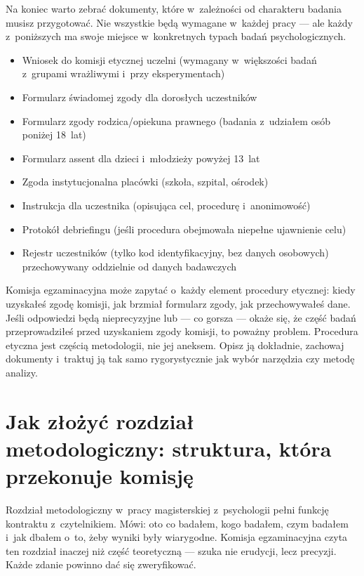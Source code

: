 \documentclass[12pt,a4paper,twoside,openany]{book}
\let\bforigsection\section
\renewcommand{\section}{\needspace{4\baselineskip}\bforigsection}
\begin{document}
Na koniec warto zebrać dokumenty, które w~zależności od charakteru badania musisz przygotować. Nie wszystkie będą wymagane w~każdej pracy --- ale każdy z~poniższych ma swoje miejsce w~konkretnych typach badań psychologicznych.

\begin{itemize}
 \item Wniosek do komisji etycznej uczelni (wymagany w~większości badań z~grupami wrażliwymi i~przy eksperymentach)
 \item Formularz świadomej zgody dla dorosłych uczestników
 \item Formularz zgody rodzica/opiekuna prawnego (badania z~udziałem osób poniżej 18~lat)
 \item Formularz assent dla dzieci i~młodzieży powyżej 13~lat
 \item Zgoda instytucjonalna placówki (szkoła, szpital, ośrodek)
 \item Instrukcja dla uczestnika (opisująca cel, procedurę i~anonimowość)
 \item Protokół debriefingu (jeśli procedura obejmowała niepełne ujawnienie celu)
 \item Rejestr uczestników (tylko kod identyfikacyjny, bez danych osobowych) przechowywany oddzielnie od danych badawczych
\end{itemize}

\begin{keyinsight}
Komisja egzaminacyjna może zapytać o~każdy element procedury etycznej: kiedy uzyskałeś zgodę komisji, jak brzmiał formularz zgody, jak przechowywałeś dane. Jeśli odpowiedzi będą nieprecyzyjne lub --- co gorsza --- okaże się, że część badań przeprowadziłeś przed uzyskaniem zgody komisji, to poważny problem. Procedura etyczna jest częścią metodologii, nie jej aneksem. Opisz ją dokładnie, zachowaj dokumenty i~traktuj ją tak samo rygorystycznie jak wybór narzędzia czy metodę analizy.
\end{keyinsight}

\section{Jak złożyć rozdział metodologiczny: struktura, która przekonuje komisję}

Rozdział metodologiczny w~pracy magisterskiej z~psychologii pełni funkcję kontraktu z~czytelnikiem. Mówi: oto co badałem, kogo badałem, czym badałem i~jak dbałem o~to, żeby wyniki były wiarygodne. Komisja egzaminacyjna czyta ten rozdział inaczej niż część teoretyczną --- szuka nie erudycji, lecz precyzji. Każde zdanie powinno dać się zweryfikować.
\end{document}
